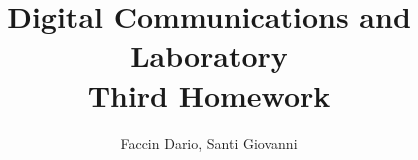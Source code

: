 \documentclass[a4paper, 12pt]{report}
\begin{document}
	
\title{Digital Communications and Laboratory \\ Third Homework}
\author{Faccin Dario, Santi Giovanni}
\date{}
\maketitle
\end{document}
